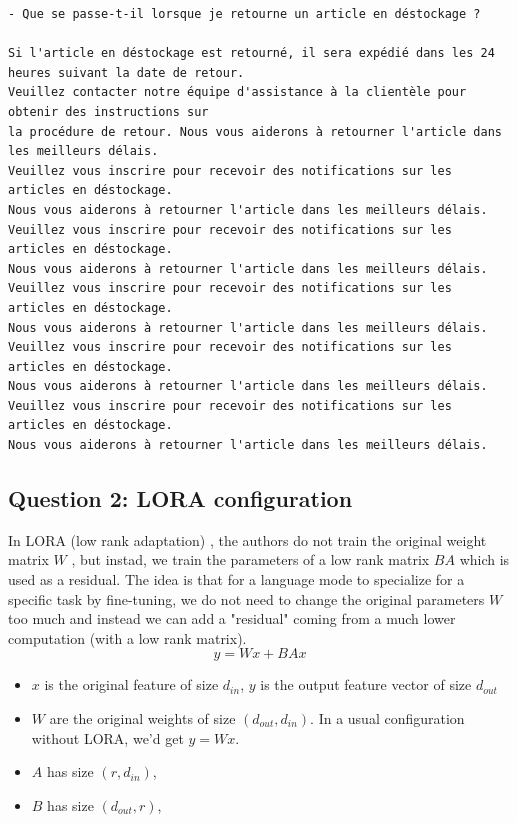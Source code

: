 \documentclass[a4paper]{article}
\begin{document}
\begin{verbatim}
- Que se passe-t-il lorsque je retourne un article en déstockage ? 

Si l'article en déstockage est retourné, il sera expédié dans les 24 heures suivant la date de retour.
Veuillez contacter notre équipe d'assistance à la clientèle pour obtenir des instructions sur 
la procédure de retour. Nous vous aiderons à retourner l'article dans les meilleurs délais.
Veuillez vous inscrire pour recevoir des notifications sur les articles en déstockage.
Nous vous aiderons à retourner l'article dans les meilleurs délais.
Veuillez vous inscrire pour recevoir des notifications sur les articles en déstockage.
Nous vous aiderons à retourner l'article dans les meilleurs délais.
Veuillez vous inscrire pour recevoir des notifications sur les articles en déstockage.
Nous vous aiderons à retourner l'article dans les meilleurs délais.
Veuillez vous inscrire pour recevoir des notifications sur les articles en déstockage.
Nous vous aiderons à retourner l'article dans les meilleurs délais.
Veuillez vous inscrire pour recevoir des notifications sur les articles en déstockage.
Nous vous aiderons à retourner l'article dans les meilleurs délais.
\end{verbatim}

\subsection*{Question 2: LORA configuration}
In LORA (low rank adaptation) \cite{hu2021lora}, the authors do not train the original weight matrix $W$ , but instad, we train the parameters of a low rank matrix $BA$ which is used as a residual.
The idea is that for a language mode to specialize for a specific task by fine-tuning, we do not need to change the original parameters $W$ too much and 
instead we can add a "residual" coming from a much lower computation (with a low rank matrix). 
$$y= Wx + BAx$$
\begin{itemize}
    \item $x$ is the original feature of size $d_{in}$, $y$ is the output feature vector of size $d_{out}$
    \item $W$ are the original weights of size $(d_{out}, d_{in})$. In a usual configuration without LORA, we'd get  $y=Wx$.
    \item $A$ has size $(r, d_{in})$,
    \item $B$ has size $(d_{out},r)$,
\end{itemize}
\end{document}
